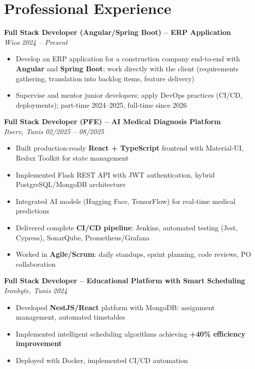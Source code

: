 \documentclass[10pt,a4paper]{article}
\begin{document}
\vspace{3pt}

\section*{Professional Experience}
\vspace{2pt}

{\small

\textbf{Full Stack Developer (Angular/Spring Boot) -- ERP Application}\\[1pt]
\textit{Wico} \hfill \textit{2024 -- Present}
\begin{itemize}[leftmargin=12pt,itemsep=1pt,topsep=1pt,parsep=0pt]
  \item Develop an ERP application for a construction company end-to-end with \textbf{Angular} and \textbf{Spring Boot}; work directly with the client (requirements gathering, translation into backlog items, feature delivery)
  \item Supervise and mentor junior developers; apply DevOps practices (CI/CD, deployments); part-time 2024--2025, full-time since 2026
\end{itemize}

\vspace{3pt}
\textbf{Full Stack Developer (PFE) -- AI Medical Diagnosis Platform}\\[1pt]
\textit{Itserv, Tunis} \hfill \textit{02/2025 -- 08/2025}
\begin{itemize}[leftmargin=12pt,itemsep=1pt,topsep=1pt,parsep=0pt]
  \item Built production-ready \textbf{React + TypeScript} frontend with Material-UI, Redux Toolkit for state management
  \item Implemented Flask REST API with JWT authentication, hybrid PostgreSQL/MongoDB architecture
  \item Integrated AI models (Hugging Face, TensorFlow) for real-time medical predictions
  \item Delivered complete \textbf{CI/CD pipeline}: Jenkins, automated testing (Jest, Cypress), SonarQube, Prometheus/Grafana
  \item Worked in \textbf{Agile/Scrum}: daily standups, sprint planning, code reviews, PO collaboration
\end{itemize}

\vspace{3pt}
\textbf{Full Stack Developer -- Educational Platform with Smart Scheduling}\\[1pt]
\textit{Ironbyte, Tunis} \hfill \textit{2024}
\begin{itemize}[leftmargin=12pt,itemsep=1pt,topsep=1pt,parsep=0pt]
  \item Developed \textbf{NestJS/React} platform with MongoDB: assignment management, automated timetables
  \item Implemented intelligent scheduling algorithms achieving \textbf{+40\% efficiency improvement}
  \item Deployed with Docker, implemented CI/CD automation
\end{itemize}

}
\end{document}
